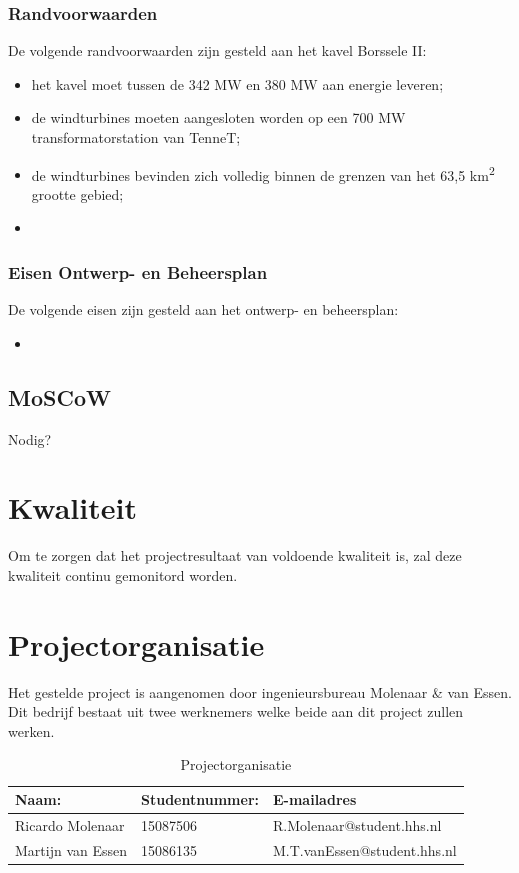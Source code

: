 \documentclass[numbers=endperiod]{scrartcl}
\begin{document}
	\subsubsection{Randvoorwaarden}
	De volgende randvoorwaarden zijn gesteld aan het kavel Borssele II:
	\begin{itemize}[noitemsep]
		\item het kavel moet tussen de 342 MW en 380 MW aan energie leveren;
		\item de windturbines moeten aangesloten worden op een 700 MW transformatorstation van TenneT;
		\item de windturbines bevinden zich volledig binnen de grenzen van het 63,5 km\textsuperscript{2} grootte gebied;
		\item
	\end{itemize}
	\subsubsection{Eisen Ontwerp- en Beheersplan}
	De volgende eisen zijn gesteld aan het ontwerp- en beheersplan:
	\begin{itemize}
	\item
	\end{itemize}
	\subsection{MoSCoW}
	Nodig?
	
	\section{Kwaliteit}
	Om te zorgen dat het projectresultaat van voldoende kwaliteit is, zal deze kwaliteit continu gemonitord worden.
	\section{Projectorganisatie}
	Het gestelde project is aangenomen door ingenieursbureau Molenaar \& van Essen. Dit bedrijf bestaat uit
	twee werknemers welke beide aan dit project zullen werken. 
	\begin{table}[h]
	\caption{Projectorganisatie}\label{table:Projectorganisatie}
	
		\centering
		\begin{tabular}{ p{} | p{} | p{} }
			Naam: 				& Studentnummer:& E-mailadres \\ \hline
			Ricardo Molenaar 	& 15087506	 	& R.Molenaar@student.hhs.nl \\
			Martijn van Essen 	& 15086135		& M.T.vanEssen@student.hhs.nl \\
		\end{tabular}
	
	\end{table}
	\newpage
\end{document}
